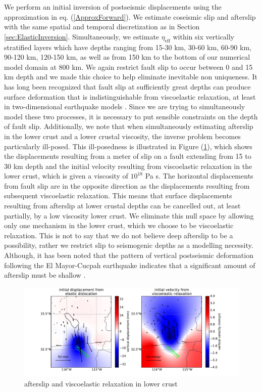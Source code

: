 \documentclass[1p]{elsarticle}
\begin{document}
We perform an initial inversion of postseismic displacements using the approximation in eq. (\ref{ApproxForward}).  We estimate coseismic slip and afterslip with the same spatial and temporal discretization as in Section \ref{sec:ElasticInversion}. Simultaneously, we estimate $\eta_{\mathrm{eff}}$ within six vertically stratified layers which have depths ranging from 15-30 km, 30-60 km, 60-90 km, 90-120 km, 120-150 km, as well as from 150 km to the bottom of our numerical model domain at 800 km.  We again restrict fault slip to occur between 0 and 15 km depth and we made this choice to help eliminate inevitable non uniqueness.  It has long been recognized that fault slip at sufficiently great depths can produce surface deformation that is indistinguishable from viscoelastic relaxation, at least in two-dimensional earthquake models \citep{Savage1990}. Since we are trying to simultaneously model these two processes, it is necessary to put sensible constraints on the depth of fault slip.  Additionally, we note that when simultaneously estimating afterslip in the lower crust and a lower crustal viscosity, the inverse problem becomes particularly ill-posed. This ill-posedness is illustrated in Figure (\ref{fig:LowerCrust}), which shows the displacements resulting from a meter of slip on a fault extending from 15 to 30 km depth and the initial velocity resulting from viscoelastic relaxation in the lower crust, which is given a viscosity of $10^{18}$ Pa s.  The horizontal displacements from fault slip are in the opposite direction as the displacements resulting from subsequent viscoelastic relaxation.  This means that surface displacements resulting from afterslip at lower crustal depths can be cancelled out, at least partially, by a low viscosity lower crust.  We eliminate this null space by allowing only one mechanism in the lower crust, which we choose to be viscoelastic relaxation.  This is not to say that we do not believe deep afterslip to be a possibility, rather we restrict slip to seismogenic depths as a modelling necessity. Although, it has been noted that the pattern of vertical postseismic deformation following the El Mayor-Cucpah earthquake indicates that a significant amount of afterslip must be shallow \citep{Rollins2015}.  
 
\begin{figure}
\includegraphics[scale=0.5]{Figures/Cancellation}
\caption{afterslip and viscoelastic relaxation in lower crust}
\label{fig:LowerCrust}
\end{figure}
 
\end{document}
